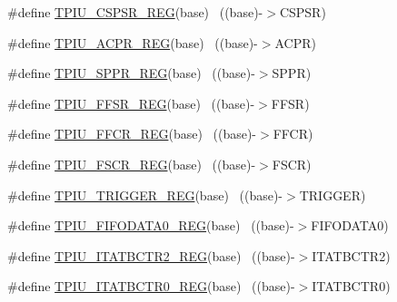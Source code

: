 \begin{DoxyCompactItemize}
\item 
\#define \hyperlink{group___t_p_i_u___register___accessor___macros_gafea47d54b3ce624f0b487095a33f87ee}{T\+P\+I\+U\+\_\+\+C\+S\+P\+S\+R\+\_\+\+R\+EG}(base)                                      ~((base)-\/$>$C\+S\+P\+SR)
\item 
\#define \hyperlink{group___t_p_i_u___register___accessor___macros_gaa1533cc1963e2e41268410ac18591036}{T\+P\+I\+U\+\_\+\+A\+C\+P\+R\+\_\+\+R\+EG}(base)                                        ~((base)-\/$>$A\+C\+PR)
\item 
\#define \hyperlink{group___t_p_i_u___register___accessor___macros_ga0999ff94c91a95cc02e2bbd25f41f2b4}{T\+P\+I\+U\+\_\+\+S\+P\+P\+R\+\_\+\+R\+EG}(base)                                        ~((base)-\/$>$S\+P\+PR)
\item 
\#define \hyperlink{group___t_p_i_u___register___accessor___macros_ga87fa1043a4397fabb81e4be255c0a6d2}{T\+P\+I\+U\+\_\+\+F\+F\+S\+R\+\_\+\+R\+EG}(base)                                        ~((base)-\/$>$F\+F\+SR)
\item 
\#define \hyperlink{group___t_p_i_u___register___accessor___macros_ga890150a55f047ae7b0e424fb1ab69c62}{T\+P\+I\+U\+\_\+\+F\+F\+C\+R\+\_\+\+R\+EG}(base)                                        ~((base)-\/$>$F\+F\+CR)
\item 
\#define \hyperlink{group___t_p_i_u___register___accessor___macros_ga9502e583218f28d70aed3da35b51fa9c}{T\+P\+I\+U\+\_\+\+F\+S\+C\+R\+\_\+\+R\+EG}(base)                                        ~((base)-\/$>$F\+S\+CR)
\item 
\#define \hyperlink{group___t_p_i_u___register___accessor___macros_gae0e1f67cdfd71a79d152c901cb744a34}{T\+P\+I\+U\+\_\+\+T\+R\+I\+G\+G\+E\+R\+\_\+\+R\+EG}(base)                                  ~((base)-\/$>$T\+R\+I\+G\+G\+ER)
\item 
\#define \hyperlink{group___t_p_i_u___register___accessor___macros_ga594012ee05bd16f52ef3428367d9aa09}{T\+P\+I\+U\+\_\+\+F\+I\+F\+O\+D\+A\+T\+A0\+\_\+\+R\+EG}(base)                              ~((base)-\/$>$F\+I\+F\+O\+D\+A\+T\+A0)
\item 
\#define \hyperlink{group___t_p_i_u___register___accessor___macros_ga99561f9638b22afba7974e22aa56d93d}{T\+P\+I\+U\+\_\+\+I\+T\+A\+T\+B\+C\+T\+R2\+\_\+\+R\+EG}(base)                              ~((base)-\/$>$I\+T\+A\+T\+B\+C\+T\+R2)
\item 
\#define \hyperlink{group___t_p_i_u___register___accessor___macros_gaebf01febdbeec8c142c03b5c074e1fed}{T\+P\+I\+U\+\_\+\+I\+T\+A\+T\+B\+C\+T\+R0\+\_\+\+R\+EG}(base)                              ~((base)-\/$>$I\+T\+A\+T\+B\+C\+T\+R0)

\end{DoxyCompactItemize}
